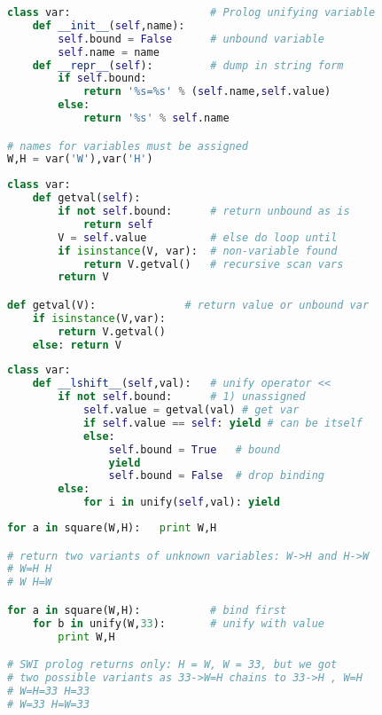 \begin{lstlisting}[language=Python]
class var:						# Prolog unifying variable
	def __init__(self,name):
		self.bound = False      # unbound variable
		self.name = name
	def __repr__(self):         # dump in string form
		if self.bound:
			return '%s=%s' % (self.name,self.value)
		else:
			return '%s' % self.name

# names for variables must be assigned
W,H = var('W'),var('H') 
\end{lstlisting}
\clearpage
\begin{lstlisting}[language=Python]
class var:
	def getval(self):
		if not self.bound:		# return unbound as is
			return self
		V = self.value			# else do loop until
		if isinstance(V, var):	# non-variable found
			return V.getval()	# recursive scan vars
		return V		

def getval(V):				# return value or unbound var
	if isinstance(V,var):
		return V.getval()
	else: return V
\end{lstlisting}
\clearpage
\begin{lstlisting}[language=Python]
class var:
	def __lshift__(self,val):   # unify operator <<
		if not self.bound:		# 1) unassigned
			self.value = getval(val) # get var
			if self.value == self: yield # can be itself
			else:
				self.bound = True	# bound
				yield
				self.bound = False	# drop binding
		else:
			for i in unify(self,val): yield
\end{lstlisting}
\clearpage
\begin{lstlisting}[language=Python]
for a in square(W,H):	print W,H

# return two variants of unknown variables: W->H and H->W
# W=H H
# W H=W

for a in square(W,H):			# bind first
   	for b in unify(W,33):		# unify with value
 		print W,H

# SWI prolog returns only: H = W, W = 33, but we got
# two possible variants as 33->W=H chains to 33->H , W=H		
# W=H=33 H=33
# W=33 H=W=33
\end{lstlisting}
		